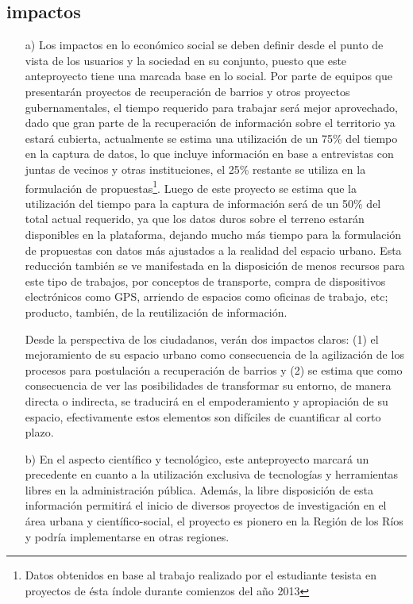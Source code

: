 \documentclass[12pt]{article}
\begin{document}
\subsection{impactos}
\begin{enumerate}
	\item[a)] Los impactos en lo económico social se deben definir desde el
        punto de vista de los usuarios y la sociedad en su conjunto,
        puesto que este anteproyecto tiene una marcada base en lo
        social. Por parte de equipos que presentarán proyectos de
        recuperación de barrios y otros proyectos gubernamentales, el
        tiempo requerido para trabajar será mejor aprovechado, dado que
        gran parte de la recuperación de información sobre el territorio
        ya estará cubierta, actualmente se estima una utilización de un
        75\% del tiempo en la captura de datos, lo que incluye
        información en base a entrevistas con juntas de vecinos y otras
        instituciones, el 25\% restante se utiliza en la formulación
        de propuestas\footnote{Datos obtenidos en base al trabajo
        realizado por el estudiante tesista en proyectos de ésta índole
        durante comienzos del año 2013}. Luego de este proyecto se estima que la
        utilización del tiempo para la captura de información será de un
        50\% del total actual requerido, ya que los datos duros sobre el
        terreno estarán disponibles en la plataforma, dejando mucho más
        tiempo para la formulación de propuestas con datos más ajustados
        a la realidad del espacio urbano. Esta reducción también se ve
        manifestada en la disposición de menos recursos para este tipo
        de trabajos, por conceptos de transporte, compra de dispositivos
        electrónicos como GPS, arriendo de espacios como oficinas de
        trabajo, etc; producto, también, de la reutilización de
        información.
        
        Desde la perspectiva de los
        ciudadanos, verán dos impactos claros: (1) el mejoramiento de su
        espacio urbano como consecuencia de la agilización de los
        procesos para postulación a recuperación de barrios y (2) se
        estima que como consecuencia de ver las posibilidades de
        transformar su entorno, de manera directa o indirecta, se
        traducirá en el empoderamiento y apropiación de su espacio,
        efectivamente estos elementos son difíciles de cuantificar al
        corto plazo.
	\item[b)] En el aspecto científico y tecnológico, este anteproyecto
        marcará un precedente en cuanto a la utilización exclusiva de
        tecnologías y herramientas libres en la administración pública.
        Además, la libre disposición de esta información permitirá el
        inicio de diversos proyectos de investigación en el área urbana
        y científico-social, el proyecto es pionero en la Región de los
        Ríos y podría implementarse en otras regiones.

\end{enumerate}
\end{document}
